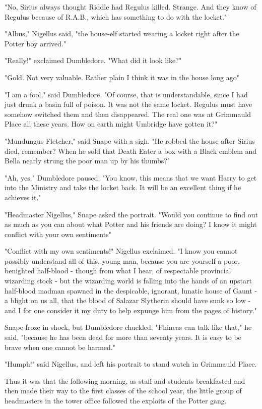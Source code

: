 "No, Sirius always thought Riddle had Regulus killed. Strange. And they know of Regulus because of R.A.B., which has something to do with the locket."

"Albus," Nigellus said, "the house-elf started wearing a locket right after the Potter boy arrived."

"Really!" exclaimed Dumbledore. "What did it look like?"

"Gold. Not very valuable. Rather plain{\el} I think it was in the house long ago{\el}"

"I am a fool," said Dumbledore. "Of course, that is understandable, since I had just drunk a basin full of poison. It was not the same locket. Regulus must have somehow switched them and then disappeared. The real one was at Grimmauld Place all these years. How on earth might Umbridge have gotten it?"

"Mundungus Fletcher," said Snape with a sigh. "He robbed the house after Sirius died, remember? When he sold that Death Eater a box with a Black emblem and Bella nearly strung the poor man up by his thumbs?"

"Ah, yes." Dumbledore paused. "You know, this means that we want Harry to get into the Ministry and take the locket back. It will be an excellent thing if he achieves it."

"Headmaster Nigellus," Snape asked the portrait. "Would you continue to find out as much as you can about what Potter and his friends are doing? I know it might conflict with your own sentiments{\el}"

"Conflict with my own sentiments!" Nigellus exclaimed. "I know you cannot possibly understand all of this, young man, because you are yourself a poor, benighted half-blood - though from what I hear, of respectable provincial wizarding stock - but the wizarding world is falling into the hands of an upstart half-blood madman spawned in the despicable, ignorant, lunatic house of Gaunt - a blight on us all, that the blood of Salazar Slytherin should have sunk so low - and I for one consider it my duty to help expunge him from the pages of history."

Snape froze in shock, but Dumbledore chuckled. "Phineas can talk like that," he said, "because he has been dead for more than seventy years. It is easy to be brave when one cannot be harmed."

"Humph!" said Nigellus, and left his portrait to stand watch in Grimmauld Place.

Thus it was that the following morning, as staff and students breakfasted and then made their way to the first classes of the school year, the little group of headmasters in the tower office followed the exploits of the Potter gang.

